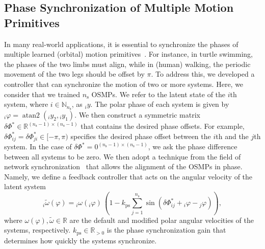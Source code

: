 \subsection{Phase Synchronization of Multiple Motion Primitives}
In many real-world applications, it is essential to synchronize the phases of multiple learned (orbital) motion primitives~\citep{gams2015accelerating}. For instance, in turtle swimming, the phases of the two limbs must align, while in (human) walking, the periodic movement of the two legs should be offset by $\pi$. To address this, we developed a controller that can synchronize the motion of two or more systems.
Here, we consider that we trained $n_\mathrm{s}$ \glspl{OSMP}. We refer to the latent state of the $i$th system, where $i \in \mathbb{N}_{n_\mathrm{s}}$, as ${}_{i} y$. The polar phase of each system is given by ${}_{i} \varphi = \operatorname{atan2}({}_{i} y_2, {}_{i} y_1)$. We then construct a symmetric matrix $\delta \Phi^* \in \mathbb{R}^{(n_\mathrm{s}-1) \times (n_\mathrm{s}-1)}$ that contains the desired phase offsets. For example, $\delta \Phi^*_{ij} = \delta \Phi^*_{ji} \in [-\pi, \pi)$ specifies the desired phase offset between the $i$th and the $j$th system. In the case of $\delta \Phi^* = 0^{(n_\mathrm{s}-1) \times (n_\mathrm{s}-1)}$, we ask the phase difference between all systems to be zero.
We then adopt a technique from the field of network synchronization~\citep{dorfler2014synchronization} that allows the alignment of the \glspl{OSMP} in phase. Namely, we define a feedback controller that acts on the angular velocity of the latent system
\begin{equation}
    {}_{i} \tilde{\omega}(\varphi) = {}_{i} \omega({}_{i}\varphi) \, \left (1  -k_\mathrm{ps} \sum_{j=1}^{n_\mathrm{s}} \sin \left ( \delta \Phi^*_{ij} + {}_{i} \varphi - {}_{j} \varphi \right ) \right ),
\end{equation}
where $\omega(\varphi), \tilde{\omega} \in \mathbb{R}$ are the default and modified polar angular velocities of the systems, respectively. 
$k_\mathrm{ps} \in \mathbb{R}_{>0}$ is the phase synchronization gain that determines how quickly the systems synchronize.
